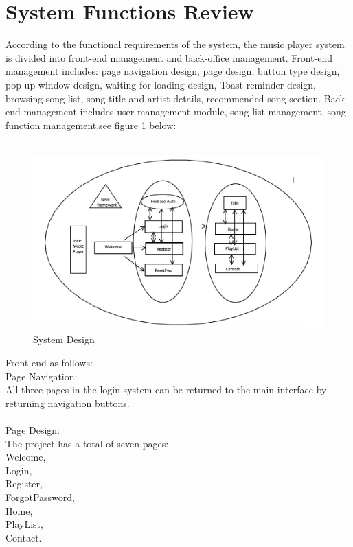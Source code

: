 \section{System Functions Review}
According to the functional requirements of the system, the music player system is divided into front-end management and back-office management. Front-end management includes: page navigation design, page design, button type design, pop-up window design, waiting for loading design, Toast reminder design, browsing song list, song title and artist details, recommended song section. Back-end management includes user management module, song list management, song function management.see figure \ref{fig:6.11 cubed graph} below: \\ \\ \begin{figure}[h]
	\centering
	\includegraphics[scale=0.4]{img/ionicSystem.png}
	\caption{System Design}
	\label{fig:6.11 cubed graph}
\end{figure}
Front-end as follows:
\\ Page Navigation: \\ All three pages in the login system can be returned to the main interface by returning navigation buttons. 
\\ \\
Page Design: \\ The project has a total of seven pages: \\
Welcome,\\Login,\\ Register,\\ ForgotPassword,\\ Home,\\ PlayList,\\ Contact.
\\ \\
